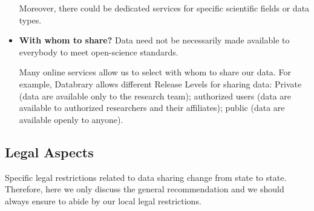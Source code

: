 \documentclass[
  11pt,
]{book}
\begin{document}
\begin{itemize}
  Moreover, there could be dedicated services for specific scientific fields or data types.
\item
  \textbf{With whom to share?} Data need not be necessarily made available to everybody to meet open-science standards.

  Many online services allow us to select with whom to share our data. For example, Databrary allows different Release Levels for sharing data: Private (data are available only to the research team); authorized users (data are available to authorized researchers and their affiliates); public (data are available openly to anyone).
\end{itemize}

\hypertarget{legal-aspects}{%
\subsection{Legal Aspects}\label{legal-aspects}}

Specific legal restrictions related to data sharing change from state to state. Therefore, here we only discuss the general recommendation and we should always ensure to abide by our local legal restrictions.
\end{document}
